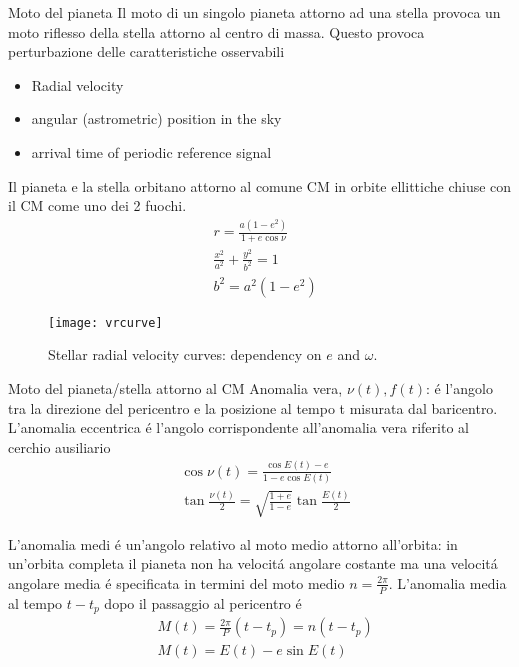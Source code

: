 \begin{frame}{Moto del pianeta}
Il moto di un singolo pianeta attorno ad una stella provoca un moto riflesso della stella attorno al centro di massa. Questo provoca perturbazione delle caratteristiche osservabili
\begin{itemize}
    \item Radial velocity
    \item angular (astrometric) position in the sky
    \item arrival time of periodic reference signal 
\end{itemize}
Il pianeta e la stella orbitano attorno al comune CM in orbite ellittiche chiuse con il CM come uno dei 2 fuochi.
\begin{align*}
&r=\frac{a(1-e^2)}{1+e\cos{\nu}}\\
&\frac{x^2}{a^2}+\frac{y^2}{b^2}=1\\
&b^2=a^2(1-e^2)
\end{align*}
\begin{figure}[!ht]
\centering
\texttt{[image: vrcurve]}
\caption{Stellar radial velocity curves: dependency on $e$ and $\omega$.}
\end{figure}
\end{frame}

\begin{wordonframe}{Moto del pianeta/stella attorno al CM}
Anomalia vera, $\nu(t), f(t)$: \'e l'angolo tra la direzione del pericentro e la posizione al tempo t misurata dal baricentro. L'anomalia eccentrica \'e l'angolo corrispondente all'anomalia vera riferito al cerchio ausiliario
\begin{align*}
&\cos{\nu(t)}=\frac{\cos{E(t)}-e}{1-e\cos{E(t)}}\\
&\tan{\frac{\nu(t)}{2}}=\sqrt{\frac{1+e}{1-e}}\tan{\frac{E(t)}{2}}
\end{align*}

L'anomalia medi \'e un'angolo relativo al moto medio attorno all'orbita: in un'orbita completa il pianeta non ha velocit\'a angolare costante ma una velocit\'a angolare media \'e specificata in termini del moto medio $n=\frac{2\pi}{P}$. L'anomalia media al tempo $t-t_p$ dopo il passaggio al pericentro \'e
\begin{align*}
&M(t)=\frac{2\pi}{P}(t-t_p)=n(t-t_p)\\
&M(t)=E(t)-e\sin{E(t)}
\end{align*}
\end{wordonframe}
